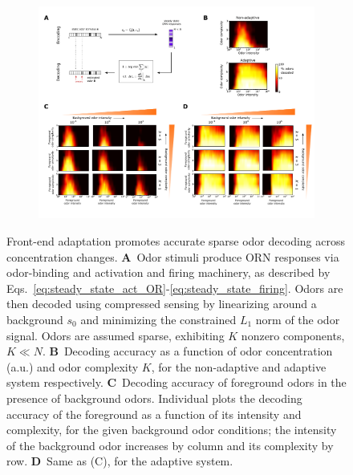 \documentclass[9pt,twocolumn,twoside,lineno]{pnas-new}
\begin{document}
\begin{figure}[!tb]
	\centering
	\begin{subfigure}[t]{\linewidth}
		\includegraphics[width=\textwidth]{figures/3_decoding_discimination}
		\label{fig:decoding_a}
	\end{subfigure}
	\begin{subfigure}[t]{0\linewidth}
		\label{fig:decoding_b}
	\end{subfigure}
	\begin{subfigure}[t]{0\linewidth}
		\label{fig:decoding_c}
	\end{subfigure}
	\begin{subfigure}[t]{0\linewidth}
		\label{fig:decoding_d}
	\end{subfigure}
	\caption{\footnotesize{Front-end adaptation promotes accurate sparse odor decoding across concentration changes. 
			\textbf{A}~Odor stimuli produce ORN responses via odor-binding and activation and firing machinery, as described by Eqs.~\ref{eq:steady_state_act_OR}-\ref{eq:steady_state_firing}. Odors are then decoded using compressed sensing by linearizing around a background $s_0$ and minimizing the constrained $L_1$ norm of the odor signal.  Odors are assumed sparse, exhibiting $K$ nonzero components, $K \ll N$. 
			\textbf{B}~Decoding accuracy as a function of odor concentration (a.u.) and odor complexity $K$, for the non-adaptive and adaptive system respectively. 
			\textbf{C}~Decoding accuracy of foreground odors in the presence of background odors. Individual plots the decoding accuracy of the foreground as a function of its intensity and complexity, for the given background odor conditions; the intensity of the background odor increases by column and its complexity by row.
			\textbf{D}~Same as (C), for the adaptive system.}}
	\label{fig:decoding}
\end{figure}
\end{document}
